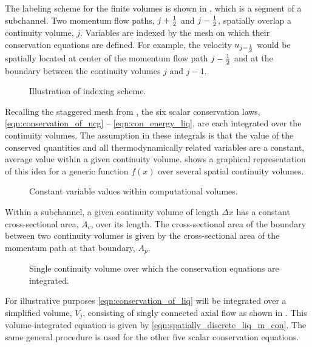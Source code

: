 The labeling scheme for the finite volumes is shown in , which is a segment of a subchannel.
Two momentum flow paths, $j + \onehalf $ and $j - \onehalf$, spatially overlap a continuity volume, $j$.
Variables are indexed by the mesh on which their conservation equations are defined.
For example, the velocity $u_{j - \onehalf}$ would be spatially located at center of the momentum flow path $j - \onehalf $ and at the boundary between the continuity volumes $j$ and $j-1$.

\begin{figure}[ht!]
\centering

\caption{Illustration of indexing scheme.}
\label{fig:vertical_pipe_with_cells}
\end{figure}

Recalling the staggered mesh from , the six scalar conservation laws, \eqref{eqn:conservation_of_ncg} -- \eqref{eqn:con_energy_liq}, are each integrated over the continuity volumes.
The assumption in these integrals is that the value of the conserved quantities and all thermodynamically related variables are a constant, average value within a given continuity volume.
 shows a graphical representation of this idea for a generic function $f(x)$ over several spatial continuity volumes. 

\begin{figure}[ht!]
\centering

\caption{Constant variable values within computational volumes.}
\label{fig:constant_value}
\end{figure}

Within a subchannel, a given continuity volume of length $\Delta x $ has a constant cross-sectional area, $A_{c}$, over its length.
The cross-sectional area of the boundary between two continuity volumes is given by the cross-sectional area of the momentum path at that boundary, $A_{p}$.

\begin{figure}[ht!]
\centering

\caption{Single continuity volume over which the conservation equations are integrated.}
\label{fig:single_volume}
\end{figure}

For illustrative purposes \eqref{eqn:conservation_of_liq} will be integrated over a simplified volume, $V_j$, consisting of singly connected axial flow as shown in .
This volume-integrated equation is given by \eqref{eqn:spatially_discrete_liq_m_con}.
The same general procedure is used for the other five scalar conservation equations.

